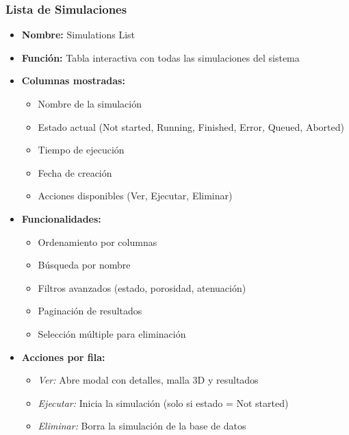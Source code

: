 \subsubsection{Lista de Simulaciones}
\begin{itemize}
    \item \textbf{Nombre:} Simulations List
    \item \textbf{Función:} Tabla interactiva con todas las simulaciones del sistema
    \item \textbf{Columnas mostradas:}
    \begin{itemize}
        \item Nombre de la simulación
        \item Estado actual (Not started, Running, Finished, Error, Queued, Aborted)
        \item Tiempo de ejecución
        \item Fecha de creación
        \item Acciones disponibles (Ver, Ejecutar, Eliminar)
    \end{itemize}
    \item \textbf{Funcionalidades:}
    \begin{itemize}
        \item Ordenamiento por columnas
        \item Búsqueda por nombre
        \item Filtros avanzados (estado, porosidad, atenuación)
        \item Paginación de resultados
        \item Selección múltiple para eliminación
    \end{itemize}
    \item \textbf{Acciones por fila:}
    \begin{itemize}
        \item \textit{Ver:} Abre modal con detalles, malla 3D y resultados
        \item \textit{Ejecutar:} Inicia la simulación (solo si estado = Not started)
        \item \textit{Eliminar:} Borra la simulación de la base de datos
    \end{itemize}
\end{itemize}

